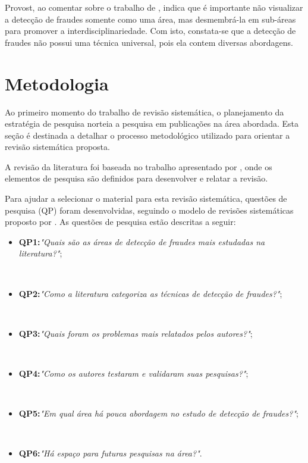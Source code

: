 \documentclass[smallextended]{svjour3}
\begin{document}
Provost, ao comentar sobre o trabalho de \cite{Bolton2002}, indica que é importante não visualizar a detecção de fraudes somente como uma área, mas desmembrá-la em sub-áreas para promover a interdisciplinariedade. Com isto, constata-se que a detecção de fraudes não possui uma técnica universal, pois ela contem diversas abordagens. 

\section{Metodologia}
\label{sec:3}

Ao primeiro momento do trabalho de revisão sistemática, o planejamento da estratégia de pesquisa norteia a pesquisa em publicações na área abordada. Esta seção é destinada a detalhar o processo metodológico utilizado para orientar a revisão sistemática proposta.

A revisão da literatura foi baseada no trabalho apresentado por \cite{Kitchenham07guidelinesfor}, onde os elementos de pesquisa são definidos para desenvolver e relatar a revisão.

Para ajudar a selecionar o material para esta revisão sistemática, questões de pesquisa (QP) foram desenvolvidas, seguindo o modelo de revisões sistemáticas proposto por \cite{Kitchenham07guidelinesfor}. As questões de pesquisa estão descritas a seguir:

\begin{itemize}
	\item \textbf{QP1:}\textit{"Quais são as áreas de detecção de fraudes mais estudadas na literatura?"};
	 
	\
	\item \textbf{QP2:}\textit{"Como a literatura categoriza as técnicas de detecção de fraudes?"};
	
	\
	\item \textbf{QP3:}\textit{"Quais foram os problemas mais relatados pelos autores?"};
	
	\
	\item \textbf{QP4:}\textit{"Como os autores testaram e validaram suas pesquisas?"};
	
	\
	\item \textbf{QP5:}\textit{"Em qual área há pouca abordagem no estudo de detecção de fraudes?"};
	
	\
	\item \textbf{QP6:}\textit{"Há espaço para futuras pesquisas na área?"}.
		
\end{itemize}
\end{document}
